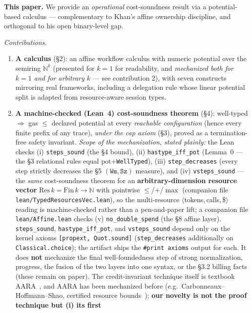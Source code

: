 \documentclass[11pt]{article}
\theoremstyle{plain}
\newcommand{\pot}{\mathrm{pot}}
\begin{document}
\textbf{This paper.} We provide an \emph{operational} cost-soundness result via a potential-based
calculus --- complementary to Khan's affine ownership discipline, and orthogonal to his open
binary-level gap.

\emph{Contributions.}
\begin{enumerate}
\item \textbf{A calculus} (\S2): an affine workflow calculus with numeric potential over the
  semiring $\mathbb{N}^k$ (presented for $k=1$ for readability, and \emph{mechanized both for
  $k=1$ and for arbitrary $k$} --- see contribution 2), with seven constructs mirroring real
  frameworks, including a delegation rule whose linear potential split is adapted from
  resource-aware session types.
\item \textbf{A machine-checked (Lean~4) cost-soundness theorem} (\S4): well-typed $\Longrightarrow$
  gas $\le$ declared potential at every \emph{reachable configuration} (hence every finite prefix
  of any trace), \emph{under the cap axiom} (\S3), proved as a termination-free safety invariant.
  \emph{Scope of the mechanization, stated plainly:} the Lean checks (i) \texttt{steps\_sound} (the
  \S4 bound), (ii) \texttt{hastype\_iff\_pot} (Lemma~0 --- the \S3 relational rules equal
  $\pot$+\texttt{WellTyped}), (iii) \texttt{step\_decreases} (every step strictly decreases the
  \S5 $(\texttt{Wm},\texttt{Sz})$ measure), and (iv) \texttt{vsteps\_sound} --- the \emph{same}
  cost-soundness theorem for an \textbf{arbitrary-dimension resource vector} $\mathrm{Res}\,k =
  \mathrm{Fin}\,k \to \mathbb{N}$ with pointwise $\le$/$+$/$\max$ (companion file
  \texttt{lean/TypedResourcesVec.lean}), so the multi-resource $\langle$tokens,\,calls,\,\$$\rangle$
  reading is machine-checked rather than a pen-and-paper lift; a companion file
  \texttt{lean/Affine.lean} checks (v) \texttt{no\_double\_spend} (the \S8 affine layer).
  \texttt{steps\_sound}, \texttt{hastype\_iff\_pot}, and \texttt{vsteps\_sound} depend only on the
  kernel axioms \texttt{[propext, Quot.sound]} (\texttt{step\_decreases} additionally on
  \texttt{Classical.choice}); the artifact ships the \texttt{\#print axioms} output for each. It
  does \textbf{not} mechanize the final well-foundedness step of strong normalization, progress, the
  fusion of the two layers into one syntax, or the \S3.2 billing facts (these remain on paper). The
  credit-invariant technique itself is textbook AARA~\cite{hofmannjost2003}, and AARA has been
  mechanized before (e.g.\ Carbonneaux--Hoffmann--Shao, certified resource
  bounds~\cite{carbonneaux2015}); \textbf{our novelty is not the proof technique but (i) its first
}
\end{enumerate}
\end{document}
